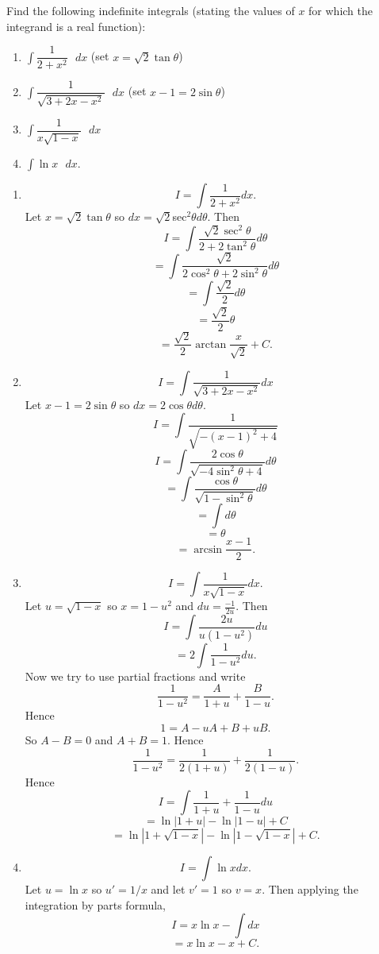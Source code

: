 Find the following indefinite integrals (stating the values of $x$ for which the integrand is a real function):
\begin{enumerate}
\item $\int \dfrac{1}{2+x^2} \text{ }dx$ (set $x = \sqrt{2}\tan\theta$)
\item $\int \dfrac{1}{\sqrt{3+2x-x^2}} \text{ }dx$ (set $x-1 = 2\sin\theta$)
\item $\int \dfrac{1}{x\sqrt{1-x}} \text{ }dx$ 
\item $\int \ln x \text{ }dx$.
\end{enumerate}
\begin{enumerate}
\item
\[
I = \int \frac{1}{2+x^2}dx.
\]
Let $x = \sqrt{2}\tan\theta$ so $dx = \sqrt{2}$sec$^2\theta d\theta$. Then
\[
I = \int \frac{\sqrt{2}\sec^2\theta}{2+2\tan^2\theta}d\theta
\]
\[
= \int \frac{\sqrt{2}}{2\cos^2\theta + 2\sin^2\theta}d\theta
\]
\[
= \int \frac{\sqrt{2}}{2}d\theta
\]
\[
= \frac{\sqrt{2}}{2}\theta
\]
\[
=\frac{\sqrt{2}}{2} \arctan{\frac{x}{\sqrt{2}}} + C.
\]
\item
\[
I = \int \frac{1}{\sqrt{3+2x-x^2}}dx
\]
Let $x-1 = 2\sin\theta$ so $dx = 2\cos\theta d\theta$.
\[
I = \int \frac{1}{\sqrt{-(x-1)^2 +4}}
\]
\[
I = \int \frac{2\cos\theta}{\sqrt{-4\sin^2\theta+4}}d\theta
\]
\[
= \int \frac{\cos\theta}{\sqrt{1-\sin^2\theta}}d\theta
\]
\[
= \int d\theta
\]
\[
= \theta
\]
\[
= \arcsin\frac{x-1}{2}.
\]
\item
\[
I = \int \frac{1}{x\sqrt{1-x}}dx.
\]
Let $u = \sqrt{1-x}$ so $x = 1-u^2$ and $du = \frac{-1}{2u}$. Then
\[
I = \int\frac{2u}{u(1-u^2)}du 
\]
\[
= 2 \int\frac{1}{1-u^2}du.
\]
Now we try to use partial fractions and write
\[
\frac{1}{1-u^2} = \frac{A}{1+u} + \frac{B}{1-u}.
\]
Hence 
\[
1 = A - uA + B + uB.
\]
So $A - B = 0$ and $A + B = 1$. Hence 
\[
\frac{1}{1-u^2} = \frac{1}{2(1+u)} + \frac{1}{2(1-u)}.
\]
Hence
\[
I = \int \frac{1}{1+u} + \frac{1}{1-u}du
\]
\[
= \ln|1+u| - \ln|1-u| + C 
\]
\[
= \ln|1 + \sqrt{1-x}| - \ln|1 - \sqrt{1-x}| + C.
\]
\item
\[
I = \int \ln x dx.
\]
Let $u = \ln x$ so $u' = 1/x$ and let $v' = 1$ so $v = x$. Then applying the integration by parts formula,
\[
I = x\ln x - \int dx
\]
\[
= x\ln x - x + C.
\]
\end{enumerate}